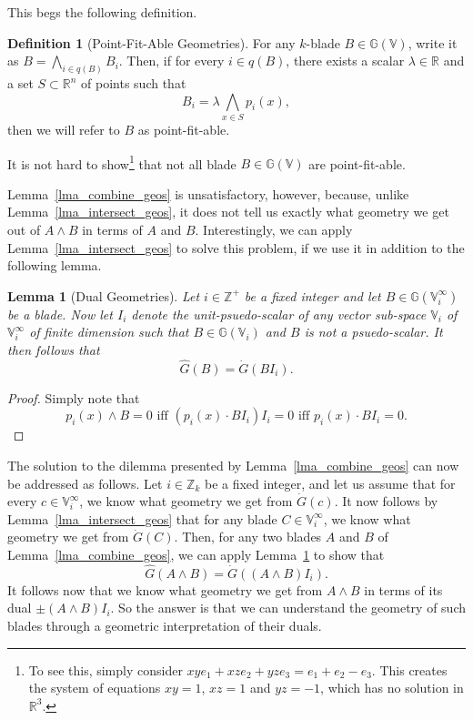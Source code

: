 \documentclass{birkjour}
\newtheorem{lem}[thm]{Lemma}
\theoremstyle{definition}
\newtheorem{defn}[thm]{Definition}
\theoremstyle{remark}
\numberwithin{equation}{section}
\newcommand{\G}{\mathbb{G}}
\newcommand{\V}{\mathbb{V}}
\newcommand{\R}{\mathbb{R}}
\newcommand{\Z}{\mathbb{Z}}
\newcommand{\Gi}{\dot{G}}
\newcommand{\Go}{\hat{G}}
\begin{document}
This begs the following definition.
\begin{defn}[Point-Fit-Able Geometries]\label{def_point_fit_geos}
For any $k$-blade $B\in\G(\V)$, write it as $B=\bigwedge_{i\in q(B)}B_i$.
Then, if for every $i\in q(B)$, there exists a scalar $\lambda\in\R$ and a
set $S\subset\R^n$ of points such that
\begin{equation}
B_i = \lambda\bigwedge_{x\in S}p_i(x),
\end{equation}
then we will refer to $B$ as point-fit-able.
\end{defn}
It is not hard to show\footnote{To
see this, simply consider $xy e_1+xz e_2 + yz e_3=e_1+e_2-e_3$.  This
creates the system of equations $xy=1$, $xz=1$ and $yz=-1$, which has
no solution in $\R^3$.} that not all blade $B\in\G(\V)$ are point-fit-able.

Lemma~\ref{lma_combine_geos} is unsatisfactory, however, because, unlike
Lemma~\ref{lma_intersect_geos}, it does not tell
us exactly what geometry we get out of $A\wedge B$ in terms of $A$ and $B$.
Interestingly, we can apply Lemma~\ref{lma_intersect_geos} to solve this
problem, if we use it in addition to the following lemma.
\begin{lem}[Dual Geometries]\label{lma_dual_geos}
Let $i\in\Z^+$ be a fixed integer and let $B\in\G(\V_i^\infty)$
be a blade.  Now let $I_i$ denote the unit-psuedo-scalar of
any vector sub-space $\V_i$ of $\V_i^\infty$ of finite dimension
such that $B\in\G(\V_i)$ and $B$ is not a psuedo-scalar.
It then follows that
\begin{equation}
\Go(B)=\Gi(BI_i).
\end{equation}
\end{lem}
\begin{proof}
Simply note that
\begin{equation}
\mbox{$p_i(x)\wedge B=0$ iff $(p_i(x)\cdot BI_i)I_i=0$ iff $p_i(x)\cdot BI_i=0$.}
\end{equation}
\end{proof}
The solution to the dilemma presented by Lemma~\ref{lma_combine_geos}
can now be addressed as follows.  Let $i\in\Z_k$ be a fixed integer,
and let us assume that for every $c\in\V_i^\infty$, we know what
geometry we get from $\Gi(c)$.  It now follows by Lemma~\ref{lma_intersect_geos}
that for any blade $C\in\V_i^\infty$, we know what geometry we get from $\Gi(C)$.
Then, for any two blades $A$ and $B$ of Lemma~\ref{lma_combine_geos},
we can apply Lemma~\ref{lma_dual_geos} to show that
\begin{equation}
\Go(A\wedge B)=\Gi((A\wedge B)I_i).
\end{equation}
It follows now that we know what geometry we get from $A\wedge B$
in terms of its dual $\pm(A\wedge B)I_i$.  So the answer is that we can understand
the geometry of such blades through a geometric interpretation of their duals.
\end{document}
